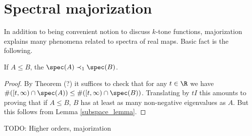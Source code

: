 \section{Spectral majorization}

In addition to being convenient notion to discuss $k$-tone functions, majorization explains many phenomena related to spectra of real maps. Basic fact is the following.

\begin{prop}
	If $A \leq B$, the $\spec(A) \prec_{1} \spec(B)$.
\end{prop}
\begin{proof}
	By Theorem (?) it suffices to check that for any $t \in \R$ we have $\#([t, \infty) \cap \spec(A)) \leq \#([t, \infty) \cap \spec(B))$. Translating by $t I$ this amounts to proving that if $A \leq B$, $B$ has at least as many non-negative eigenvalues as $A$. But this follows from Lemma \ref{subspace_lemma}.
\end{proof}

TODO: Higher orders, majorization


